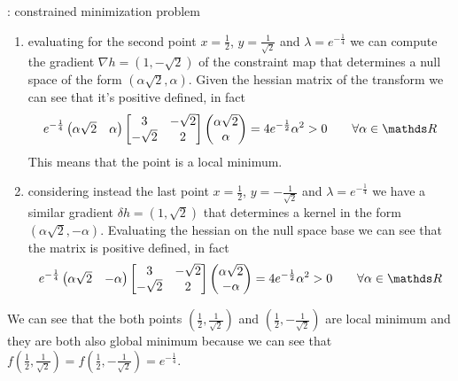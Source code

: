 \begin{example}{: constrained minimization problem}
\begin{enumerate}
			\item evaluating for the second point $x = \frac 1 2$, $y = \frac{1}{\sqrt 2}$ and $\lambda = e^{-\frac 14}$ we can compute the gradient $\nabla h = (1, - \sqrt 2)$ of the constraint map that determines a null space of the form $(\alpha \sqrt 2,\alpha)$. Given the hessian matrix of the transform we can see that it's positive defined, in fact
			\[ e^{-\frac 1 4} \begin{pmatrix}
				\alpha \sqrt 2 & \alpha
			\end{pmatrix} \begin{bmatrix}
				3 & -\sqrt 2 \\ -\sqrt 2 & 2 
			\end{bmatrix} \begin{pmatrix}
				\alpha \sqrt 2 \\ \alpha
			\end{pmatrix} = 4 e^{-\frac 12} \alpha^2 > 0 \qquad \forall \alpha \in \R \]
			This means that the point is a local minimum.
			
			\item considering instead the last point $x = \frac 1 2$, $y = - \frac{1}{\sqrt 2}$ and $\lambda = e^{-\frac 14}$ we have a similar gradient $\delta h = (1,\sqrt 2)$ that determines a kernel in the form $(\alpha \sqrt 2,-\alpha)$. Evaluating the hessian on the null space base we can see that the matrix is positive defined, in fact
			\[ e^{-\frac 1 4} \begin{pmatrix}
				\alpha \sqrt 2 & -\alpha
			\end{pmatrix} \begin{bmatrix}
				3 & -\sqrt 2 \\ -\sqrt 2 & 2 
			\end{bmatrix} \begin{pmatrix}
				\alpha \sqrt 2 \\ -\alpha
			\end{pmatrix} = 4 e^{-\frac 12} \alpha^2 > 0 \qquad \forall \alpha \in \R \]
		\end{enumerate}
		
		We can see that the both points $\left(\frac 12, \frac 1{\sqrt 2}\right)$ and $\left(\frac 12, -\frac 1{\sqrt 2}\right)$ are local minimum and they are both also global minimum because we can see that $f\left(\frac 12, \frac 1{\sqrt 2}\right) = f\left(\frac 12, - \frac 1{\sqrt 2}\right) = e^{-\frac 1 4}$.
	\end{example}
	
